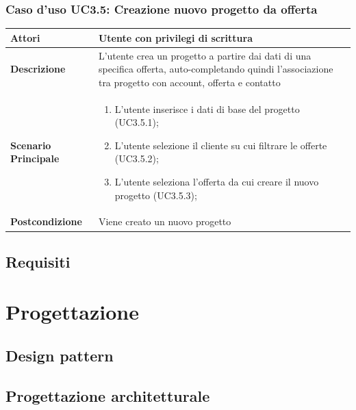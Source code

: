 \documentclass[12pt,a4paper,twoside,openright,english]{book}
\begin{document}
\begin{small}
	\subsection{Caso d'uso UC3.5: Creazione nuovo progetto da offerta}
	\begin{longtable}{ | p{2.7cm} | p{12cm} |}
		\hline \textbf{Attori} & Utente con privilegi di scrittura\\ 
		\hline \textbf{Descrizione} & L'utente crea un progetto a partire dai dati di una specifica offerta, auto-completando quindi l'associazione tra progetto con account, offerta e contatto\\ 
		\hline \textbf{Scenario Principale} & \begin{enumerate}
			\item L’utente inserisce i dati di base del progetto  (UC3.5.1);
			\item L’utente selezione il cliente su cui filtrare le offerte  (UC3.5.2);
			\item L’utente seleziona l’offerta da cui creare il nuovo progetto  (UC3.5.3);
			
		\end{enumerate}
		\\ 
		\hline \textbf{Postcondizione} & Viene creato un nuovo progetto\\ 
		\hline 
	\end{longtable}
\end{small}





\section{Requisiti}\label{requisiti}


\chapter{Progettazione}\label{progettazione}

\section{Design pattern}\label{design_pattern}
\section{Progettazione architetturale}\label{progettazione_architetturale}
\end{document}
